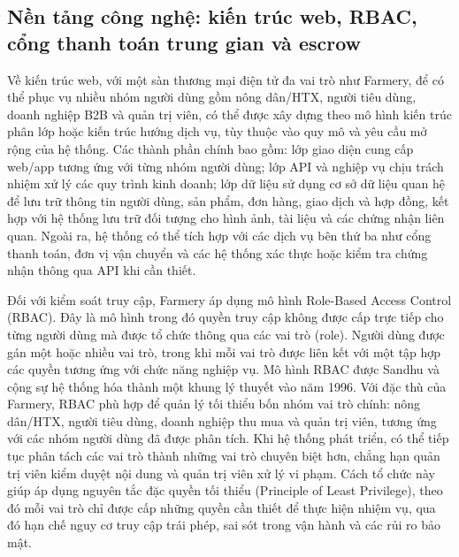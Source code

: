 \subsection{Nền tảng công nghệ: kiến trúc web, RBAC, cổng thanh toán trung gian và escrow}

Về kiến trúc web, với một sàn thương mại điện tử đa vai trò như Farmery, để có thể phục vụ nhiều nhóm người dùng gồm nông dân/HTX, người tiêu dùng, doanh nghiệp B2B và quản trị viên, có thể được xây dựng theo mô hình kiến trúc phân lớp hoặc kiến trúc hướng dịch vụ, tùy thuộc vào quy mô và yêu cầu mở rộng của hệ thống. Các thành phần chính bao gồm: lớp giao diện cung cấp web/app tương ứng với từng nhóm người dùng; lớp API và nghiệp vụ chịu trách nhiệm xử lý các quy trình kinh doanh; lớp dữ liệu sử dụng cơ sở dữ liệu quan hệ để lưu trữ thông tin người dùng, sản phẩm, đơn hàng, giao dịch và hợp đồng, kết hợp với hệ thống lưu trữ đối tượng cho hình ảnh, tài liệu và các chứng nhận liên quan. Ngoài ra, hệ thống có thể tích hợp với các dịch vụ bên thứ ba như cổng thanh toán, đơn vị vận chuyển và các hệ thống xác thực hoặc kiểm tra chứng nhận thông qua API khi cần thiết.


Đối với kiểm soát truy cập, Farmery áp dụng mô hình Role-Based Access Control (RBAC). Đây là mô hình trong đó quyền truy cập không được cấp trực tiếp cho từng người dùng mà được tổ chức thông qua các vai trò (role). Người dùng được gán một hoặc nhiều vai trò, trong khi mỗi vai trò được liên kết với một tập hợp các quyền tương ứng với chức năng nghiệp vụ. Mô hình RBAC được Sandhu và cộng sự hệ thống hóa thành một khung lý thuyết vào năm 1996. Với đặc thù của Farmery, RBAC phù hợp để quản lý tối thiểu bốn nhóm vai trò chính: nông dân/HTX, người tiêu dùng, doanh nghiệp thu mua và quản trị viên, tương ứng với các nhóm người dùng đã được phân tích. Khi hệ thống phát triển, có thể tiếp tục phân tách các vai trò thành những vai trò chuyên biệt hơn, chẳng hạn quản trị viên kiểm duyệt nội dung và quản trị viên xử lý vi phạm. Cách tổ chức này giúp áp dụng nguyên tắc đặc quyền tối thiểu (Principle of Least Privilege), theo đó mỗi vai trò chỉ được cấp những quyền cần thiết để thực hiện nhiệm vụ, qua đó hạn chế nguy cơ truy cập trái phép, sai sót trong vận hành và các rủi ro bảo mật.


